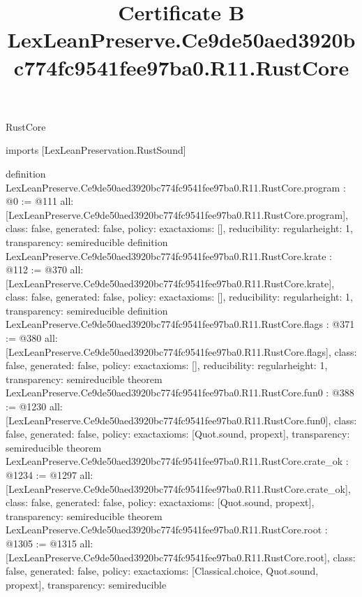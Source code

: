 \begin{lexlean}{RustCore}
\title{Certificate B LexLeanPreserve.Ce9de50aed3920bc774fc9541fee97ba0.R11.RustCore}
\begin{coremodule}
imports [LexLeanPreservation.RustSound]

definition LexLeanPreserve.Ce9de50aed3920bc774fc9541fee97ba0.R11.RustCore.program : @0 := @111 {
  all: [LexLeanPreserve.Ce9de50aed3920bc774fc9541fee97ba0.R11.RustCore.program],
  class: false,
  generated: false,
  policy: exact{axioms: []},
  reducibility: regular{height: 1},
  transparency: semireducible
}
definition LexLeanPreserve.Ce9de50aed3920bc774fc9541fee97ba0.R11.RustCore.krate : @112 := @370 {
  all: [LexLeanPreserve.Ce9de50aed3920bc774fc9541fee97ba0.R11.RustCore.krate],
  class: false,
  generated: false,
  policy: exact{axioms: []},
  reducibility: regular{height: 1},
  transparency: semireducible
}
definition LexLeanPreserve.Ce9de50aed3920bc774fc9541fee97ba0.R11.RustCore.flags : @371 := @380 {
  all: [LexLeanPreserve.Ce9de50aed3920bc774fc9541fee97ba0.R11.RustCore.flags],
  class: false,
  generated: false,
  policy: exact{axioms: []},
  reducibility: regular{height: 1},
  transparency: semireducible
}
theorem LexLeanPreserve.Ce9de50aed3920bc774fc9541fee97ba0.R11.RustCore.fun0 : @388 := @1230 {
  all: [LexLeanPreserve.Ce9de50aed3920bc774fc9541fee97ba0.R11.RustCore.fun0],
  class: false,
  generated: false,
  policy: exact{axioms: [Quot.sound, propext]},
  transparency: semireducible
}
theorem LexLeanPreserve.Ce9de50aed3920bc774fc9541fee97ba0.R11.RustCore.crate_ok : @1234 := @1297 {
  all: [LexLeanPreserve.Ce9de50aed3920bc774fc9541fee97ba0.R11.RustCore.crate_ok],
  class: false,
  generated: false,
  policy: exact{axioms: [Quot.sound, propext]},
  transparency: semireducible
}
theorem LexLeanPreserve.Ce9de50aed3920bc774fc9541fee97ba0.R11.RustCore.root : @1305 := @1315 {
  all: [LexLeanPreserve.Ce9de50aed3920bc774fc9541fee97ba0.R11.RustCore.root],
  class: false,
  generated: false,
  policy: exact{axioms: [Classical.choice, Quot.sound, propext]},
  transparency: semireducible
}


\end{coremodule}
\end{lexlean}
